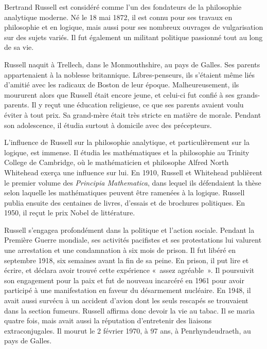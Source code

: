 \documentclass[../../../include/open-logic-section]{subfiles}
\begin{document}



Bertrand Russell est considéré comme l'un des fondateurs de la
philosophie analytique moderne. Né le 18 mai 1872, il est connu pour
ses travaux en philosophie et en logique, mais aussi pour ses nombreux
ouvrages de vulgarisation sur des sujets variés. Il fut également un
militant politique passionné tout au long de sa vie.

Russell naquit à Trellech, dans le Monmouthshire, au pays de Galles.
Ses parents appartenaient à la noblesse britannique. Libres-penseurs,
ils s'étaient même liés d'amitié avec les radicaux de Boston de leur
époque. Malheureusement, ils moururent alors que Russell était encore
jeune, et celui-ci fut confié à ses grands-parents. Il y reçut une
éducation religieuse, ce que ses parents avaient voulu éviter à tout
prix. Sa grand-mère était très stricte en matière de morale. Pendant
son adolescence, il étudia surtout à domicile avec des précepteurs.

L'influence de Russell sur la philosophie analytique, et
particulièrement sur la logique, est immense. Il étudia les
mathématiques et la philosophie au Trinity College de Cambridge, où
le mathématicien et philosophe Alfred North Whitehead exerça une
influence sur lui. En 1910, Russell et Whitehead publièrent le premier
volume des \emph{Principia Mathematica}, dans lequel ils défendaient
la thèse selon laquelle les mathématiques peuvent être ramenées à la
logique. Russell publia ensuite des centaines de livres, d'essais et
de brochures politiques. En 1950, il reçut le prix Nobel de
littérature.

Russell s'engagea profondément dans la politique et l'action sociale.
Pendant la Première Guerre mondiale, ses activités pacifistes et ses
protestations lui valurent une arrestation et une condamnation
à six mois de prison. Il fut libéré en septembre 1918, six semaines
avant la fin de sa peine. En prison, il put lire et écrire, et déclara
avoir trouvé cette expérience
«~assez agréable~». Il poursuivit son engagement pour la paix et fut de nouveau
incarcéré en 1961 pour avoir participé à une manifestation en faveur
du désarmement nucléaire. En 1948, il avait aussi survécu à un
accident d'avion dont les seuls rescapés se trouvaient dans la section
fumeurs. Russell affirma donc devoir la vie au tabac. Il se maria
quatre fois, mais avait aussi la réputation d'entretenir des liaisons
extraconjugales. Il mourut le 2 février 1970, à 97 ans, à
Penrhyndeudraeth, au pays de Galles.
\end{document}
